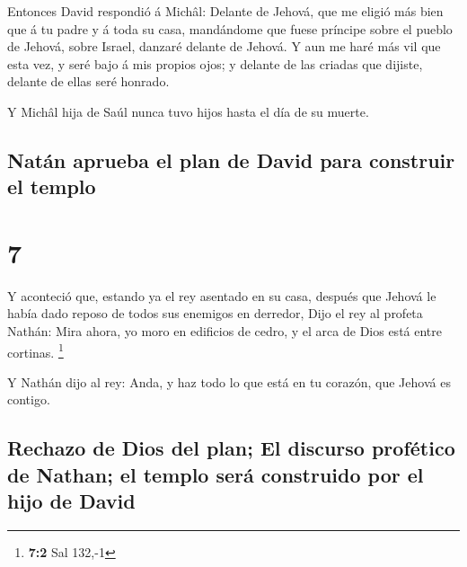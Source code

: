  Entonces David respondió á Michâl: Delante de Jehová, que
me eligió más bien que á tu padre y á toda su casa, mandándome que fuese
príncipe sobre el pueblo de Jehová, sobre Israel, danzaré delante de
Jehová.  Y aun me haré más vil que esta vez, y seré bajo á
mis propios ojos; y delante de las criadas que dijiste, delante de ellas
seré honrado.

 Y Michâl hija de Saúl nunca tuvo hijos hasta el día de su
muerte.

\hypertarget{natuxe1n-aprueba-el-plan-de-david-para-construir-el-templo}{%
\subsection{Natán aprueba el plan de David para construir el
templo}\label{natuxe1n-aprueba-el-plan-de-david-para-construir-el-templo}}

\hypertarget{section-6}{%
\section{7}\label{section-6}}

 Y aconteció que, estando ya el rey asentado en su casa,
después que Jehová le había dado reposo de todos sus enemigos en
derredor,  Dijo el rey al profeta Nathán: Mira ahora, yo
moro en edificios de cedro, y el arca de Dios está entre cortinas.
\footnote{\textbf{7:2} Sal 132,-1}

 Y Nathán dijo al rey: Anda, y haz todo lo que está en tu
corazón, que Jehová es contigo.

\hypertarget{rechazo-de-dios-del-plan-el-discurso-profuxe9tico-de-nathan-el-templo-seruxe1-construido-por-el-hijo-de-david}{%
\subsection{Rechazo de Dios del plan; El discurso profético de Nathan;
el templo será construido por el hijo de
David}\label{rechazo-de-dios-del-plan-el-discurso-profuxe9tico-de-nathan-el-templo-seruxe1-construido-por-el-hijo-de-david}}

